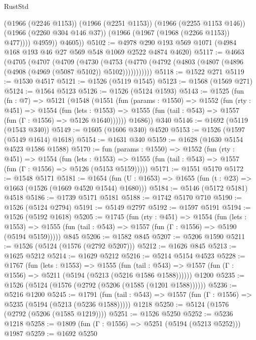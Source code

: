 \begin{lexlean}{RustStd}
\begin{coremodule}
                (@1966 (@2246 @1153))
                (@1966 (@2251 @1153))
                (@1966 (@2255 @1153 @146))
                (@1966 (@2260 @304 @146 @37))
                (@1966 (@1967 (@1968 (@2266 @1153)) @477))))
            @4959))
        @4605))
@5102 := @4978 @290 @193 @569 @1071 (@4984 @168 @193 @46 @27 @569 @548 @1069 @2522 @4874 @4620)
@5117 := @4663
    (@4705
      (@4707
        (@4709
          (@4730
            (@4753 (@4770 (@4792 (@4803 (@4807 (@4896 (@4908 (@4969 (@5087 @5102)) @5102)))))))))))
@5118 := @1522 @271
@5119 := @1530 @4517
@5121 := @1526 (@5119 @1545)
@5123 := @1568 (@1569 @271)
@5124 := @1564 @5123
@5126 := @1526 (@5124 @1593)
@5143 := @1525
    (fun (fn : @7) =>
    @5121
      (@1548
        (@1551
          (fun (params : @1550) =>
          @1552
            (fun (rty : @451) =>
            @1554
              (fun (lets : @1553) =>
              @1555 (fun (tail : @543) => @1557 (fun (Γ : @1556) => @5126 @1640))))))
        @1686))
    @340
@5146 := @1692 (@5119 (@1543 @340))
@5149 := @1605 (@1606 @340) @4520
@5153 := @1526 (@1597 (@5149 @1614) @1618)
@5154 := @1631 @340
@5159 := @1628 (@1630 @5154 @4523 @1586 @1588)
@5170 := fun (params : @1550) =>
  @1552
    (fun (rty : @451) =>
    @1554
      (fun (lets : @1553) =>
      @1555 (fun (tail : @543) => @1557 (fun (Γ : @1556) => @5126 (@5153 @5159)))))
@5171 := @1551 @5170
@5172 := @1548 @5171
@5181 := @1654 (fun (U : @1653) => @1655 (fun (t : @23) => @1663 (@1526 (@1669 @4520 @1544) @1680)))
@5184 := @5146 (@5172 @5181) @4518
@5186 := @1739 @5171 @5181
@5188 := @1742 @5170 @710
@5190 := @1526 (@5124 @2794)
@5191 := @5149 @2797
@5192 := @1597 @5191
@5194 := @1526 (@5192 @1618)
@5205 := @1745
    (fun (rty : @451) =>
    @1554
      (fun (lets : @1553) =>
      @1555 (fun (tail : @543) => @1557 (fun (Γ : @1556) => @5190 (@5194 @5159)))))
    @845
@5206 := @1582 @845
@5207 := @5206 @1590
@5211 := @1526 (@5124 (@1576 (@2792 @5207)))
@5212 := @1626 @845
@5213 := @1625 @5212
@5214 := @1629 @5212
@5216 := @5214 @5154 @4523
@5228 := @1767
    (fun (lets : @1553) =>
    @1555
      (fun (tail : @543) => @1557 (fun (Γ : @1556) => @5211 (@5194 (@5213 (@5216 @1586 @1588))))))
    @1200
@5235 := @1526 (@5124 (@1576 (@2792 (@5206 (@1585 (@1201 @1588))))))
@5236 := @5216 @1200
@5245 := @1791
    (fun (tail : @543) => @1557 (fun (Γ : @1556) => @5235 (@5194 (@5213 (@5236 @1588)))))
    @1218
@5250 := @5124 (@1576 (@2792 (@5206 (@1585 @1219))))
@5251 := @1526 @5250
@5252 := @5236 @1218
@5258 := @1809 (fun (Γ : @1556) => @5251 (@5194 (@5213 @5252))) @1987
@5259 := @1692 @5250

\end{coremodule}
\end{lexlean}
